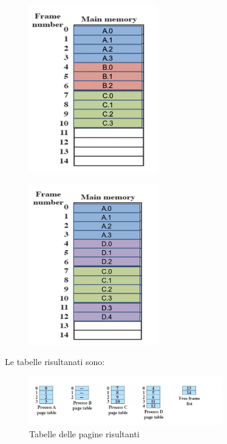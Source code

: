     \begin{figure}[H]
        \centering
        \includegraphics[width=0.5\textwidth]{immagini/PaginazioneEsempio2}
    \end{figure}
    \begin{figure}[H]
        \centering
        \includegraphics[width=0.5\textwidth]{immagini/PaginazioneEsempio3}
    \end{figure}
    Le tabelle risultanati sono:
    \begin{figure}[H]
        \centering
        \includegraphics[width=0.75\textwidth]{immagini/PagineRisultanti}
        \caption{Tabelle delle pagine risultanti}
    \end{figure}

